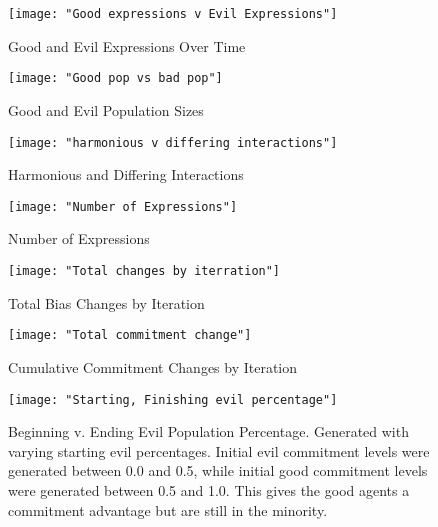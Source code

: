 \documentclass[]{article}
\begin{document}
\begin{figure}
	\centering
	\texttt{[image: "Good expressions v Evil Expressions"]}
	\caption{Good and Evil Expressions Over Time}
	\label{fig:good v evil expressions}
\end{figure}

\begin{figure}
	\centering
	\texttt{[image: "Good pop vs bad pop"]}
	\caption{Good and Evil Population Sizes}
	\label{fig:good v evil pop sizes}
\end{figure}

\begin{figure}
	\centering
	\texttt{[image: "harmonious v differing interactions"]}
	\caption{Harmonious and Differing Interactions}
	\label{fig:harmonious v differing}
\end{figure} 

\begin{figure}
	\centering
	\texttt{[image: "Number of Expressions"]}
	\caption{Number of Expressions}
	\label{fig:expressions}
\end{figure} 

\begin{figure}
	\centering
	\texttt{[image: "Total changes by iterration"]}
	\caption{Total Bias Changes by Iteration}
	\label{fig:changes by iteration}
\end{figure} 

\begin{figure}
	\centering
	\texttt{[image: "Total commitment change"]}
	\caption{Cumulative Commitment Changes by Iteration}
	\label{fig:commitment changes}
\end{figure} 

\begin{figure}
	\centering
	\texttt{[image: "Starting, Finishing evil percentage"]}
	\caption{Beginning v. Ending Evil Population Percentage. Generated with varying starting evil percentages. Initial evil commitment levels were generated between 0.0 and 0.5, while initial good commitment levels were generated between 0.5 and 1.0. This gives the good agents a commitment advantage but are still in the minority.}
	\label{fig:evil v evil}
	
\end{figure}
\end{document}
